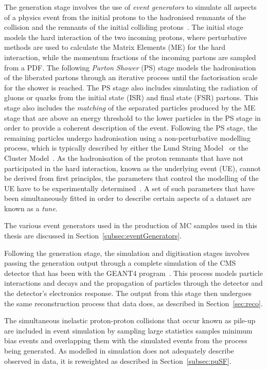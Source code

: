 The generation stage involves the use of \emph{event generators} to simulate all aspects of a physics event from the initial protons to the hadronised remnants of the collision and the remnants of the initial colliding protons~\cite{Buckley:2011ms,Hoche:2014rga}.
The initial stage models the hard interaction of the two incoming protons, where perturbative methods are used to calculate the Matrix Elements (ME) for the hard interaction, while the momentum fractions of the incoming partons are sampled from a PDF.
The following \emph{Parton Shower} (PS) stage models the hadronisation of the liberated partons through an iterative process until the factorisation scale for the shower is reached.
The PS stage also includes simulating the radiation of gluons or quarks from the initial state (ISR) and final state (FSR) partons.
This stage also includes the \emph{matching} of the separated particles produced by the ME stage that are above an energy threshold to the lower \pT particles in the PS stage in order to provide a coherent description of the event.
Following the PS stage, the remaining particles undergo hadronisation using a non-perturbative modelling process, which is typically described by either the Lund String Model~\cite{Andersson:1983ia} or the Cluster Model~\cite{Winter:2003tt}.
As the hadronisation of the proton remnants that have not participated in the hard interaction, known as the underlying event (UE), cannot be derived from first principles, the parameters that control the modelling of the UE have to be experimentally determined~\cite{Khachatryan:2015pea}.
A set of such parameters that have been simultaneously fitted in order to describe certain aspects of a dataset are known as a \emph{tune}.

The various event generators used in the production of MC samples used in this thesis are discussed in Section~\ref{subsec:eventGenerators}.

Following the generation stage, the simulation and digitisation stages involves passing the generation output through a complete simulation of the CMS detector that has been with the GEANT4 program~\cite{geant4,Lefebure:1999wja}.
This process models particle interactions and decays and the propagation of particles through the detector and the detector's electronics response.
The output from this stage then undergoes the same reconstruction process that data does, as described in Section~\ref{sec:reco}.

The simultaneous inelastic proton-proton collisions that occur known as pile-up are included in event simulation by sampling large statistics samples minimum bias events and overlapping them with the simulated events from the process being generated.
As \PU modelled in simulation does not adequately describe observed \PU in data, it is reweighted as described in Section~\ref{subsec:puSF}.

